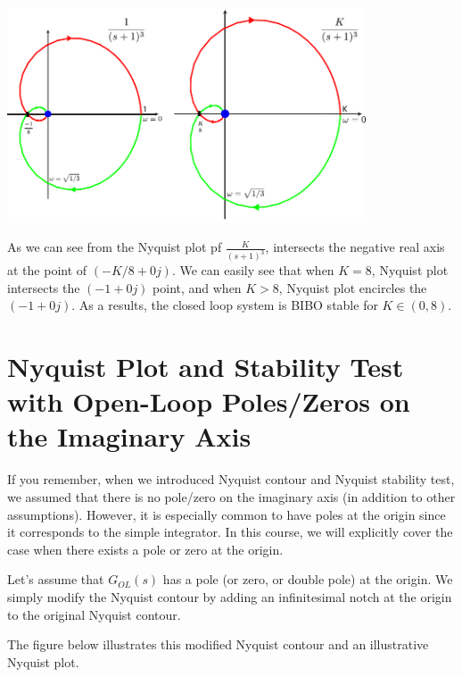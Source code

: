 \documentclass{article}
\begin{document}
  \begin{minipage}[h]{1\linewidth}
    \begin{center}
      \includegraphics[width=0.8\textwidth]{figs/exK2}
    \end{center}
  \end{minipage}

\vspace{6 pt}

As we can see from the Nyquist plot pf $\frac{K}{(s+1)^3}$, 
intersects the negative real axis at the point of $(-K/8 + 0 j)$.
We can easily see that when $K = 8$, Nyquist plot intersects 
the $(-1 + 0 j)$ point, and when $K > 8$, Nyquist plot encircles 
the $(-1 + 0 j)$. As a results, the closed loop system is BIBO
stable for $K \in (0 , 8)$.
 
\section*{Nyquist Plot and Stability Test with  Open-Loop Poles/Zeros on the Imaginary Axis}

If you remember, when we introduced Nyquist contour and Nyquist stability test, we assumed that there is no pole/zero on the imaginary axis (in addition to other assumptions). However, it is especially common to have poles at the origin since it corresponds to the simple integrator. In this course, we will explicitly cover the case when there exists a pole or zero at the origin.

Let's assume that $G_{OL}(s)$ has a pole (or zero, or double pole)
at the origin. We simply modify the Nyquist contour by adding an
infinitesimal notch at the origin to the original Nyquist contour. 

The figure below illustrates this modified Nyquist contour and 
an illustrative Nyquist plot. 

\vspace{12 pt}
\end{document}
